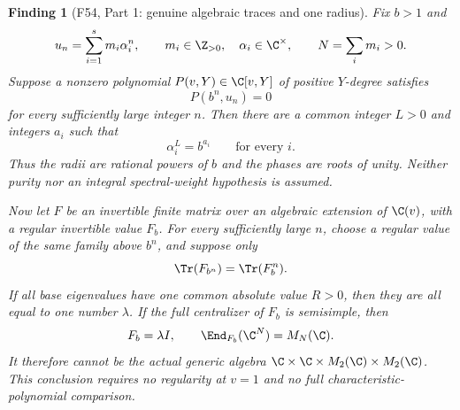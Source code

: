 \documentclass[11pt,a4paper]{article}
\newcommand{\fid}[1]{\textsf{#1}}\newcommand{\gate}[1]{\textsf{#1}}
\theoremstyle{named}\newtheorem{finding}{Finding}[section]
\theoremstyle{definition}\newtheorem{definition}[finding]{Definition}
\theoremstyle{remark}\newtheorem{remark}[finding]{Remark}
\begin{document}
\begin{finding}[\fid{F54}, Part 1: genuine algebraic traces and one radius]
\label{f:algebraicgenuinetrace}
Fix $b>1$ and
\[
 u_n=\sum_{i=1}^s m_i\alpha_i^n,\qquad
 m_i\in\Z_{>0},\quad \alpha_i\in\C^\times,\qquad
 N=\sum_i m_i>0.
\]
Suppose a nonzero polynomial $P(v,Y)\in\C[v,Y]$
of positive $Y$-degree satisfies
\begin{equation}\label{eq:genuinetracealgebraic}
 P(b^n,u_n)=0
\end{equation}
for every sufficiently large integer $n$.
Then there are a common integer $L>0$ and integers
$a_i$ such that
\begin{equation}\label{eq:genuinetracepowers}
 \alpha_i^L=b^{a_i}\qquad\text{for every }i.
\end{equation}
Thus the radii are rational powers of $b$ and the phases
are roots of unity. Neither purity nor an integral
spectral-weight hypothesis is assumed.

Now let $F$ be an invertible finite matrix over an algebraic
extension of $\C(v)$, with a regular invertible value $F_b$.
For every sufficiently large $n$, choose a regular value
of the same family above $b^n$, and suppose only
\begin{equation}\label{eq:genuineidentityretuning}
 \Tr(F_{b^n})=\Tr(F_b^n).
\end{equation}
If all base eigenvalues have one common absolute value
$R>0$, then they are all equal to one number $\lambda$.
If the full centralizer of $F_b$ is semisimple, then
\[
 F_b=\lambda I,\qquad
 \End_{F_b}(\C^N)=M_N(\C).
\]
It therefore cannot be the actual generic algebra
$\C\times\C\times M_2(\C)\times M_2(\C)$.
This conclusion requires no regularity at $v=1$ and
no full characteristic-polynomial comparison.
\end{finding}
\end{document}
